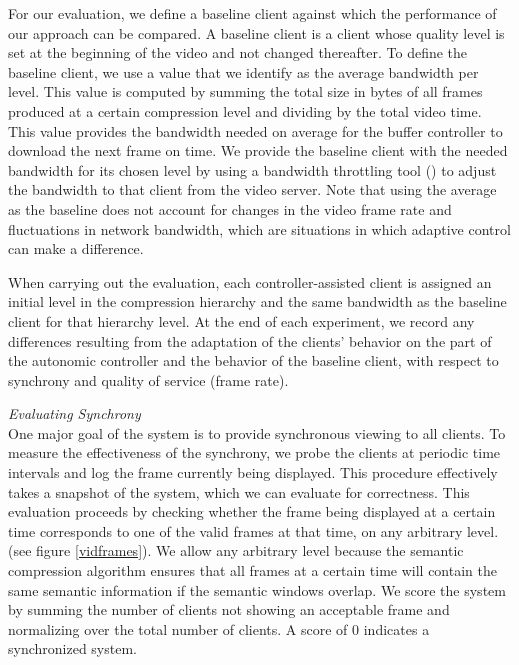 \documentclass{sig-alternate}
\begin{document}
For our evaluation, we define a baseline client against which the
performance of our approach can be compared.  A baseline client is a
client whose quality level is set at the beginning of the video and
not changed thereafter.  To define the baseline client, we use a value
that we identify as the average bandwidth per level. This value is
computed by summing the total size in bytes of all frames produced at
a certain compression level and dividing by the total video time.
This value provides the bandwidth needed on average for the buffer
controller to download the next frame on time.  We provide the
baseline client with the needed bandwidth for its chosen level by
using a bandwidth throttling tool (\cite{SHAPERD}) to adjust the
bandwidth to that client from the video server.  Note that using the
average as the baseline does not account for changes in the video
frame rate and fluctuations in network bandwidth, which are situations
in which adaptive control can make a difference.

When carrying out the evaluation, each controller-assisted client is
assigned an initial level in the compression hierarchy and the same
bandwidth as the baseline client for that hierarchy level.  At the end
of each experiment, we record any differences resulting from the
adaptation of the clients' behavior on the part of the autonomic
controller and the behavior of the baseline client, with respect to
synchrony and quality of service (frame rate).

 

\textit{Evaluating Synchrony} \\ One major goal of the system is to
provide synchronous viewing to all clients.  To measure the
effectiveness of the synchrony, we probe the clients at periodic time
intervals and log the frame currently being displayed.  This procedure
effectively takes a snapshot of the system, which we can evaluate for
correctness.  This evaluation proceeds by checking whether the frame
being displayed at a certain time corresponds to one of the valid
frames at that time, on any arbitrary level.  (see figure \ref{vidframes}).  We
allow any arbitrary level because the semantic compression algorithm
ensures that all frames at a certain time will contain the same
semantic information if the semantic windows overlap.  We score the
system by summing the number of clients not showing an acceptable
frame and normalizing over the total number of clients.  A score of 0
indicates a synchronized system.
\end{document}
